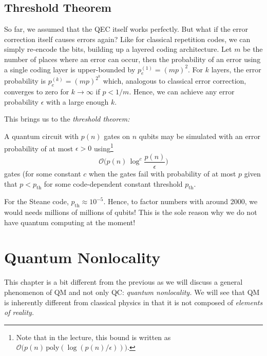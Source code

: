 	\section{Threshold Theorem}
		\label{sec:downer}

		So far, we assumed that the \ac{QEC} itself works perfectly. But what if the error correction itself causes errors again? Like for classical repetition codes, we can simply re-encode the bits, building up a layered coding architecture. Let \(m\) be the number of places where an error can occur, then the probability of an error using a single coding layer is upper-bounded by \( p_e^{(1)} = (mp)^2 \). For \(k\) layers, the error probability is \( p_e^{(k)} = (mp)^{2^k} \) which, analogous to classical error correction, converges to zero for \(k \to \infty\) if \(p < 1/m\). Hence, we can achieve any error probability \(\epsilon\) with a large enough \(k\).

		This brings us to the \emph{threshold theorem:}
		\begin{theorem}
			A quantum circuit with \(p(n)\) gates on \(n\) qubits may be simulated with an error probability of at most \(\epsilon > 0\) using\footnote{Note that in the lecture, this bound is written as \( \mathcal{O}\bigl( p(n) \, \mathrm{poly}( \log(p(n)/\epsilon) ) \bigr) \).}
			\begin{equation}
				\mathcal{O}\Biggl( p(n) \, \log^c \frac{p(n)}{\epsilon} \Biggr)
			\end{equation}
			gates (for some constant \(c\) when the gates fail with probability of at most \(p\) given that \(p < p_\mathrm{th}\) for some code-dependent constant threshold \(p_\mathrm{th}\).
		\end{theorem}
		For the Steane code, \( p_\mathrm{th} \approx 10^{-5} \). Hence, to factor numbers with around \num{2000}, we would needs millions of millions of qubits! This is the sole reason why we do not have quantum computing at the moment!

\chapter{Quantum Nonlocality}
	\label{c:nonlocality}

	This chapter is a bit different from the previous as we will discuss a general phenomenon of \ac{QM} and not only \ac{QC}: \emph{quantum nonlocality.} We will see that \ac{QM} is inherently different from classical physics in that it is not composed of \emph{elements of reality.}

